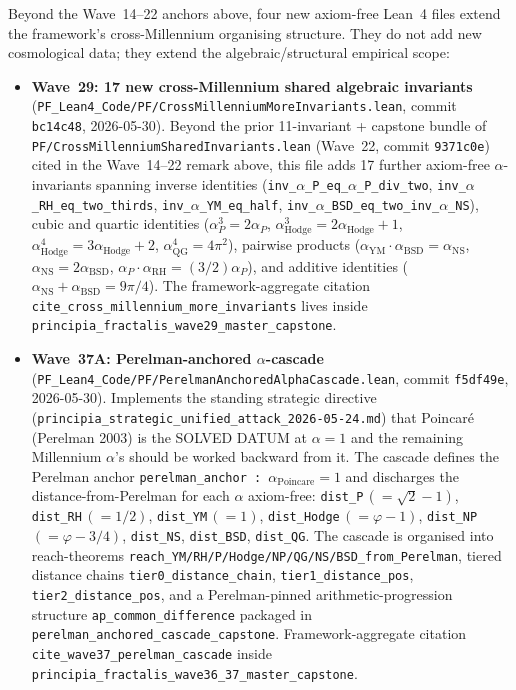 \begin{remark}\label{rem:ch29-wave29-37}
Beyond the Wave~14--22 anchors above, four new axiom-free Lean~4 files extend the framework's cross-Millennium organising structure. They do not add new cosmological data; they extend the algebraic/structural empirical scope:
\begin{itemize}
  \item \textbf{Wave~29: 17 new cross-Millennium shared algebraic invariants} (\texttt{PF\_Lean4\_Code/PF/CrossMillenniumMoreInvariants.lean}, commit \texttt{bc14c48}, 2026-05-30). Beyond the prior 11-invariant + capstone bundle of \texttt{PF/CrossMillenniumSharedInvariants.lean} (Wave~22, commit \texttt{9371c0e}) cited in the Wave~14--22 remark above, this file adds 17 further axiom-free $\alpha$-invariants spanning inverse identities (\texttt{inv\_$\alpha$\_P\_eq\_$\alpha$\_P\_div\_two}, \texttt{inv\_$\alpha$\_RH\_eq\_two\_thirds}, \texttt{inv\_$\alpha$\_YM\_eq\_half}, \texttt{inv\_$\alpha$\_BSD\_eq\_two\_inv\_$\alpha$\_NS}), cubic and quartic identities ($\alpha_P^3 = 2\alpha_P$, $\alpha_{\mathrm{Hodge}}^3 = 2\alpha_{\mathrm{Hodge}} + 1$, $\alpha_{\mathrm{Hodge}}^4 = 3\alpha_{\mathrm{Hodge}} + 2$, $\alpha_{\mathrm{QG}}^4 = 4\pi^2$), pairwise products ($\alpha_{\mathrm{YM}} \cdot \alpha_{\mathrm{BSD}} = \alpha_{\mathrm{NS}}$, $\alpha_{\mathrm{NS}} = 2\alpha_{\mathrm{BSD}}$, $\alpha_P \cdot \alpha_{\mathrm{RH}} = (3/2)\alpha_P$), and additive identities ($\alpha_{\mathrm{NS}} + \alpha_{\mathrm{BSD}} = 9\pi/4$). The framework-aggregate citation \texttt{cite\_cross\_millennium\_more\_invariants} lives inside \texttt{principia\_fractalis\_wave29\_master\_capstone}.
  \item \textbf{Wave~37A: Perelman-anchored $\alpha$-cascade} (\texttt{PF\_Lean4\_Code/PF/PerelmanAnchoredAlphaCascade.lean}, commit \texttt{f5df49e}, 2026-05-30). Implements the standing strategic directive (\texttt{principia\_strategic\_unified\_attack\_2026-05-24.md}) that Poincaré (Perelman 2003) is the SOLVED DATUM at $\alpha = 1$ and the remaining Millennium $\alpha$'s should be worked backward from it. The cascade defines the Perelman anchor \texttt{perelman\_anchor : $\alpha_{\mathrm{Poincare}} = 1$} and discharges the distance-from-Perelman for each $\alpha$ axiom-free: \texttt{dist\_P}\,$(=\sqrt{2}-1)$, \texttt{dist\_RH}\,$(=1/2)$, \texttt{dist\_YM}\,$(=1)$, \texttt{dist\_Hodge}\,$(=\varphi-1)$, \texttt{dist\_NP}\,$(=\varphi-3/4)$, \texttt{dist\_NS}, \texttt{dist\_BSD}, \texttt{dist\_QG}. The cascade is organised into reach-theorems \texttt{reach\_YM/RH/P/Hodge/NP/QG/NS/BSD\_from\_Perelman}, tiered distance chains \texttt{tier0\_distance\_chain}, \texttt{tier1\_distance\_pos}, \texttt{tier2\_distance\_pos}, and a Perelman-pinned arithmetic-progression structure \texttt{ap\_common\_difference} packaged in \texttt{perelman\_anchored\_cascade\_capstone}. Framework-aggregate citation \texttt{cite\_wave37\_perelman\_cascade} inside \texttt{principia\_fractalis\_wave36\_37\_master\_capstone}.

\end{itemize}
\end{remark}
